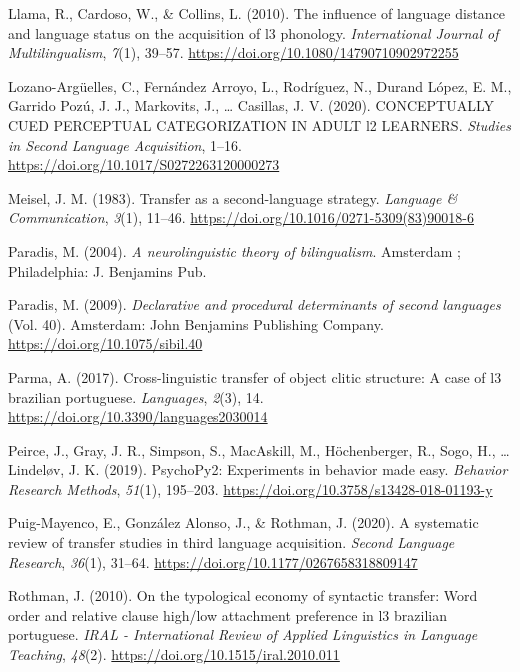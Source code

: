 \documentclass[
  english,
  man]{apa6}
\begin{document}
\leavevmode\hypertarget{ref-llama_influence_2010}{}%
Llama, R., Cardoso, W., \& Collins, L. (2010). The influence of language distance and language status on the acquisition of l3 phonology. \emph{International Journal of Multilingualism}, \emph{7}(1), 39--57. \url{https://doi.org/10.1080/14790710902972255}

\leavevmode\hypertarget{ref-lozano-arguelles_conceptually_2020}{}%
Lozano-Argüelles, C., Fernández Arroyo, L., Rodríguez, N., Durand López, E. M., Garrido Pozú, J. J., Markovits, J., \ldots{} Casillas, J. V. (2020). CONCEPTUALLY CUED PERCEPTUAL CATEGORIZATION IN ADULT l2 LEARNERS. \emph{Studies in Second Language Acquisition}, 1--16. \url{https://doi.org/10.1017/S0272263120000273}

\leavevmode\hypertarget{ref-meisel_transfer_1983}{}%
Meisel, J. M. (1983). Transfer as a second-language strategy. \emph{Language \& Communication}, \emph{3}(1), 11--46. \url{https://doi.org/10.1016/0271-5309(83)90018-6}

\leavevmode\hypertarget{ref-paradis_neurolinguistic_2004}{}%
Paradis, M. (2004). \emph{A neurolinguistic theory of bilingualism}. Amsterdam ; Philadelphia: J. Benjamins Pub.

\leavevmode\hypertarget{ref-paradis_declarative_2009}{}%
Paradis, M. (2009). \emph{Declarative and procedural determinants of second languages} (Vol. 40). Amsterdam: John Benjamins Publishing Company. \url{https://doi.org/10.1075/sibil.40}

\leavevmode\hypertarget{ref-parma_cross-linguistic_2017}{}%
Parma, A. (2017). Cross-linguistic transfer of object clitic structure: A case of l3 brazilian portuguese. \emph{Languages}, \emph{2}(3), 14. \url{https://doi.org/10.3390/languages2030014}

\leavevmode\hypertarget{ref-peirce_psychopy2_2019}{}%
Peirce, J., Gray, J. R., Simpson, S., MacAskill, M., Höchenberger, R., Sogo, H., \ldots{} Lindeløv, J. K. (2019). PsychoPy2: Experiments in behavior made easy. \emph{Behavior Research Methods}, \emph{51}(1), 195--203. \url{https://doi.org/10.3758/s13428-018-01193-y}

\leavevmode\hypertarget{ref-puig-mayenco_systematic_2020}{}%
Puig-Mayenco, E., González Alonso, J., \& Rothman, J. (2020). A systematic review of transfer studies in third language acquisition. \emph{Second Language Research}, \emph{36}(1), 31--64. \url{https://doi.org/10.1177/0267658318809147}

\leavevmode\hypertarget{ref-rothman_typological_2010}{}%
Rothman, J. (2010). On the typological economy of syntactic transfer: Word order and relative clause high/low attachment preference in l3 brazilian portuguese. \emph{IRAL - International Review of Applied Linguistics in Language Teaching}, \emph{48}(2). \url{https://doi.org/10.1515/iral.2010.011}
\end{document}
